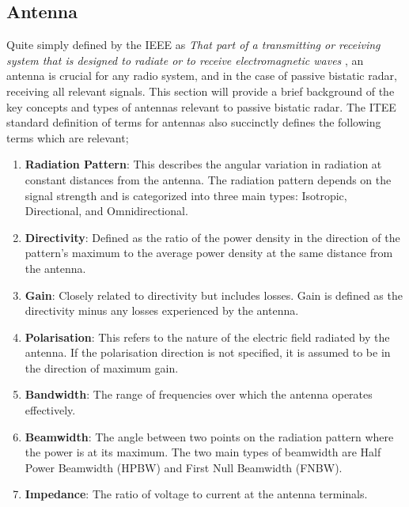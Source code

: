 \subsection{Antenna \label{sec: antennaBackground}}
Quite simply defined by the IEEE as \textit{That part of a transmitting or receiving system that is designed to radiate or to receive electromagnetic waves} \cite{AntennaIEEE}, an antenna is crucial for any radio system, and in the case of passive bistatic radar, receiving all relevant signals. This section will provide a brief background of the key concepts and types of antennas relevant to passive bistatic radar. The ITEE standard definition of terms for antennas \cite{AntennaIEEE} also succinctly defines the following terms which are relevant;
\begin{enumerate}
    \item \textbf{Radiation Pattern}: This describes the angular variation in radiation at constant distances from the antenna. The radiation pattern depends on the signal strength and is categorized into three main types: Isotropic, Directional, and Omnidirectional.
    
    \item \textbf{Directivity}: Defined as the ratio of the power density in the direction of the pattern's maximum to the average power density at the same distance from the antenna.
    
    \item \textbf{Gain}: Closely related to directivity but includes losses. Gain is defined as the directivity minus any losses experienced by the antenna.
    
    \item \textbf{Polarisation}: This refers to the nature of the electric field radiated by the antenna. If the polarisation direction is not specified, it is assumed to be in the direction of maximum gain.
    
    \item \textbf{Bandwidth}: The range of frequencies over which the antenna operates effectively.
    
    \item \textbf{Beamwidth}: The angle between two points on the radiation pattern where the power is at its maximum. The two main types of beamwidth are Half Power Beamwidth (HPBW) and First Null Beamwidth (FNBW).
    
    \item \textbf{Impedance}: The ratio of voltage to current at the antenna terminals.
\end{enumerate}


